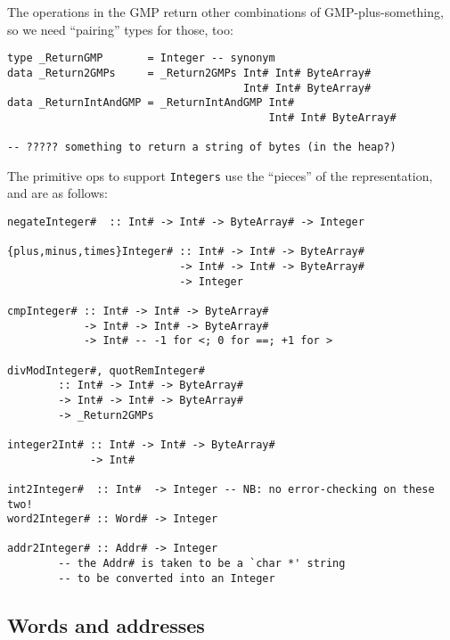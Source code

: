 The operations in the GMP return other combinations of
GMP-plus-something, so we need ``pairing'' types for those, too:
\begin{verbatim}
type _ReturnGMP       = Integer -- synonym
data _Return2GMPs     = _Return2GMPs Int# Int# ByteArray#
                                     Int# Int# ByteArray#
data _ReturnIntAndGMP = _ReturnIntAndGMP Int#
                                         Int# Int# ByteArray#

-- ????? something to return a string of bytes (in the heap?)
\end{verbatim}
The primitive ops to support \mbox{\tt Integers} use the ``pieces'' of the
representation, and are as follows:
\begin{verbatim}
negateInteger#  :: Int# -> Int# -> ByteArray# -> Integer

{plus,minus,times}Integer# :: Int# -> Int# -> ByteArray#
                           -> Int# -> Int# -> ByteArray#
                           -> Integer

cmpInteger# :: Int# -> Int# -> ByteArray#
            -> Int# -> Int# -> ByteArray#
            -> Int# -- -1 for <; 0 for ==; +1 for >

divModInteger#, quotRemInteger#
        :: Int# -> Int# -> ByteArray#
        -> Int# -> Int# -> ByteArray#
        -> _Return2GMPs

integer2Int# :: Int# -> Int# -> ByteArray#
             -> Int# 

int2Integer#  :: Int#  -> Integer -- NB: no error-checking on these two!
word2Integer# :: Word# -> Integer

addr2Integer# :: Addr# -> Integer
        -- the Addr# is taken to be a `char *' string
        -- to be converted into an Integer
\end{verbatim}


\subsection{Words and addresses}

